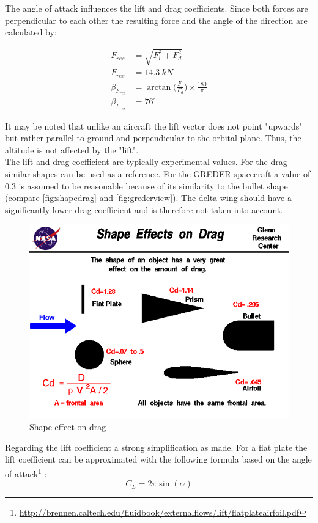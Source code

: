The angle of attack influences the lift and drag coefficients. Since both forces are perpendicular to each other the resulting force and the angle of the direction are calculated by:

\begin{align}
	F_{res} &= \sqrt{F_l^2+F_d^2}\\
	F_{res} &= 14.3\ kN\\
	\beta_{F_{res}} &=\arctan\bigg(\frac{F_l}{F_d}\bigg)\times\frac{180}\pi\\
	\beta_{F_{res}} &=76^\circ
\end{align}

It may be noted that unlike an aircraft the lift vector does not point "upwards" but rather parallel to ground and perpendicular to the orbital plane. Thus, the altitude is not affected by the "lift".\\

The lift and drag coefficient are typically experimental values. For the drag similar shapes can be used as a reference. For the GREDER spacecraft a value of 0.3 is assumed to be reasonable because of its similarity to the bullet shape (compare \autoref{fig:shapedrag} and \autoref{fig:grederview}). The delta wing should have a significantly lower drag coefficient and is therefore not taken into account.
\begin{figure}[H]
	\centering\includegraphics[width=0.7\linewidth]{shapedrag}
	\caption{Shape effect on drag}\label{fig:shapedrag}
\end{figure}

Regarding the lift coefficient a strong simplification as made. For a flat plate the lift coefficient can be approximated with the following formula based on the angle of attack\footnote{\url{http://brennen.caltech.edu/fluidbook/externalflows/lift/flatplateairfoil.pdf}} :
\begin{equation}
	C_L = 2\pi\sin(\alpha)
\end{equation}

